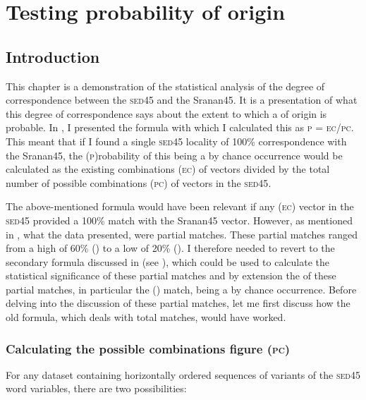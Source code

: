 \chapter{Testing probability of origin}\label{ch:4}

\section{Introduction} \label{4.1}
This chapter is a demonstration of the statistical analysis of the degree of correspondence between the \textsc{sed45} and the Sranan45. It is a presentation of what this degree of correspondence says about the extent to which a  of origin is probable. In , I presented the formula with which I calculated this  as \textsc{p} = \textsc{ec}\slash\textsc{pc}. This meant that if I found a single \textsc{sed45} locality of 100\% correspondence with the Sranan45, the (\textsc{p})robability of this being a by chance occurrence would be calculated as the existing combinations (\textsc{ec}) of vectors divided by the total number of possible combinations (\textsc{pc}) of vectors in the \textsc{sed45}.

The above-mentioned formula would have been relevant if any (\textsc{ec}) vector in the \textsc{sed45} provided a 100\% match with the Sranan45 vector. However, as mentioned in , what the data presented, were partial matches. These partial matches ranged from a high of 60\% () to a low of 20\% (). I therefore needed to revert to the secondary formula discussed in  (see ), which could be used to calculate the statistical significance of these partial matches and by extension the  of these partial matches, in particular the () match, being a by chance occurrence. Before delving into the discussion of these partial matches, let me first discuss how the old  formula, which deals with total matches, would have worked.

\subsection{Calculating the possible combinations figure (\textsc{pc})} \label{4.1.1}
For any dataset containing horizontally ordered sequences of variants of the \textsc{sed45} word variables, there are two possibilities:

